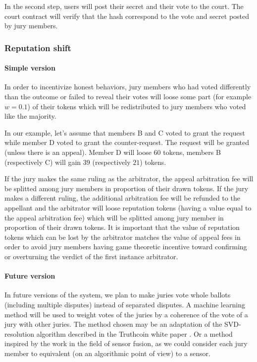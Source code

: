 \documentclass[12 pt]{article}
\begin{document}
In the second step, users will post their secret and their vote to the court. The court contract will verify that the hash correspond to the vote and secret posted by jury members.

\subsubsection{Reputation shift}

\paragraph{Simple version}

In order to incentivize honest behaviors, jury members who had voted differently than the outcome or failed to reveal their votes will loose some part (for example $w=0.1$) of their tokens which will be redistributed to jury members who voted like the majority.

In our example, let's assume that members B and C voted to grant the request while member D voted to grant the counter-request.
The request will be granted (unless there is an appeal). Member D will loose $60$ tokens, members B (respectively C) will gain $39$ (respectively $21$) tokens.


If the jury makes the same ruling as the arbitrator, the appeal arbitration fee will be splitted among jury members in proportion of their drawn tokens.
If the jury makes a different ruling, the additional arbitration fee will be refunded to the appellant and the arbitrator will loose reputation tokens (having a value equal to the appeal arbitration fee) which will be splitted among jury member in proportion of their drawn tokens.
It is important that the value of reputation tokens which can be lost by the arbitrator matches the value of appeal fees in order to avoid jury members having game theoretic incentive toward confirming or overturning the verdict of the first instance arbitrator.



\paragraph{Future version}

In future versions of the system, we plan to make juries vote whole ballots (including multiple disputes) instead of separated disputes.
A machine learning method will be used to weight votes of the juries by a coherence of the vote of a jury with other juries. The method chosen may be an adaptation of the SVD-resolution algorithm described in the Truthcoin white paper \cite{truthcoin}. Or a method inspired by the work in the field of sensor fusion, as we could consider each jury member to equivalent (on an algorithmic point of view) to a sensor.
\end{document}
